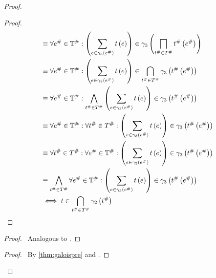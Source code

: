 \begin{proof}
\begin{proof}
\begin{align*}
            &\equiv
            \forall e^\# \in \mathbb{T}^\# : \left( \sum_{e \in \concrete_3\left(e^\#\right)} t\left(e\right) \right) \in \concrete_3\left(\bigsqcap_{t^\# \in T^\#} t^\#\left(e^\#\right)\right) \\
            &\equiv
            \forall e^\# \in \mathbb{T}^\# : \left( \sum_{e \in \concrete_3\left(e^\#\right)} t\left(e\right) \right) \in \bigcap_{t^\# \in T^\#} \concrete_3\left(t^\#\left(e^\#\right)\right) \\
            &\equiv
            \forall e^\# \in \mathbb{T}^\# : \bigwedge_{t^\# \in T^\#} \left( \sum_{e \in \concrete_3\left(e^\#\right)} t\left(e\right) \right) \in \concrete_3\left(t^\#\left(e^\#\right)\right) \\
            &\equiv
            \forall e^\# \in \mathbb{T}^\# : \forall t^\# \in T^\# : \left( \sum_{e \in \concrete_3\left(e^\#\right)} t\left(e\right) \right) \in \concrete_3\left(t^\#\left(e^\#\right)\right) \\
            &\equiv
            \forall t^\# \in T^\# : \forall e^\# \in \mathbb{T}^\# : \left( \sum_{e \in \concrete_3\left(e^\#\right)} t\left(e\right) \right) \in \concrete_3\left(t^\#\left(e^\#\right)\right) \\
            &\equiv
            \bigwedge_{t^\# \in T^\#} \forall e^\# \in \mathbb{T}^\# : \left( \sum_{e \in \concrete_3\left(e^\#\right)} t\left(e\right) \right) \in \concrete_3\left(t^\#\left(e^\#\right)\right) \\
            &\iff
            t \in \bigcap_{t^\# \in T^\#} \concrete_2\left(t^\#\right)
        \end{align*}
    \end{proof}
    \begin{proof}
        \pf\ Analogous to .
    \end{proof}
    \qedstep
    \begin{proof}
        \pf\ By \autoref{thm:galoispre} and .
    \end{proof}
\end{proof}
